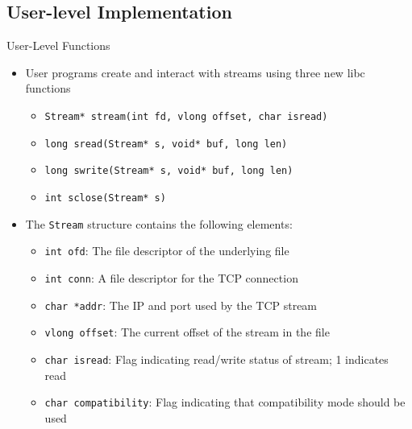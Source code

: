\documentclass[11pt,compress]{beamer}
\begin{document}
\subsection{User-level Implementation}

\begin{frame}{User-Level Functions}
\begin{itemize}
	\item User programs create and interact with streams using three new libc functions
	\begin{itemize}
		\item {\tt Stream* stream(int fd, vlong offset, char isread)}
		\item {\tt long sread(Stream* s, void* buf, long len)}
		\item {\tt long swrite(Stream* s, void* buf, long len)}
		\item {\tt int sclose(Stream* s)}
	\end{itemize}
	\item The {\tt Stream} structure contains the following elements:
	\begin{itemize}
		\item {\tt int ofd}: The file descriptor of the underlying file
		\item {\tt int conn}: A file descriptor for the TCP connection
		\item {\tt char *addr}: The IP and port used by the TCP stream
		\item {\tt vlong offset}: The current offset of the stream in the file
		\item {\tt char isread}: Flag indicating read/write status of stream; 1 indicates read
		\item {\tt char compatibility}: Flag indicating that compatibility mode should be used
	\end{itemize}
\end{itemize}
\end{frame}
\end{document}
